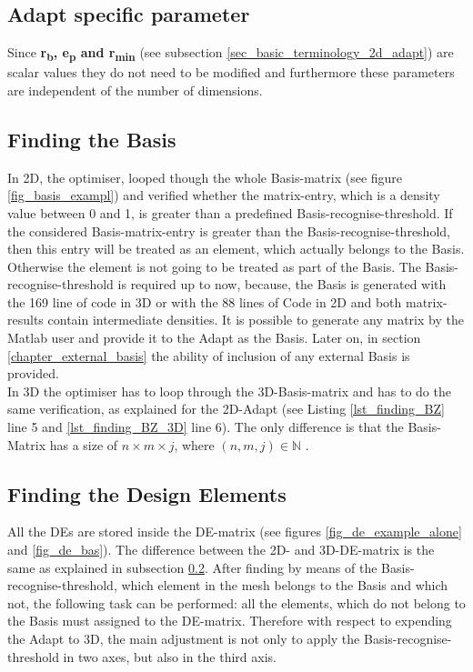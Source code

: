 \subsection{ Adapt specific parameter }
Since \textbf{r\textsubscript{b}, e\textsubscript{p} and  r\textsubscript{min}} (see subsection \ref{sec_basic_terminology_2d_adapt}) are  scalar
values they do not need to be modified and furthermore 
these parameters are independent of the number of dimensions. \\

\subsection{Finding the \textbf{Basis}} 
\label{subsection_finding_basis}

In 2D, the optimiser, looped though the whole Basis-matrix (see figure \ref{fig_basis_exampl}) and verified whether the matrix-entry, which is a density value between 0 and 1, is greater than a predefined Basis-recognise-threshold. If the considered Basis-matrix-entry is greater than
the Basis-recognise-threshold, then this entry
 will be treated as an element, which actually belongs to the Basis.
 Otherwise the element is not going to be treated as part of the Basis.
 The Basis-recognise-threshold is required up to now, because, the Basis is generated with the 169 line of code in 3D or with the 88 lines of Code in 2D and both
  matrix-results contain intermediate densities.
  It is possible to generate any matrix by the Matlab user
   and provide it to the Adapt as the Basis. 
   Later on, in section \ref{chapter_external_basis} 
   the ability of inclusion of any external Basis is provided.\\
   
In 3D the optimiser has to loop through the 3D-Basis-matrix and has to do the same verification, as explained for the 2D-Adapt (see Listing \ref{lst_finding_BZ} line 5 and \ref{lst_finding_BZ_3D} line 6).
 The only difference is that the Basis-Matrix has a size of \textbf{$n \times m \times j$}, where  $(n , m,j) \in \mathbb{N} $ .\\


\subsection{Finding the \textbf{Design Elements}}
\label{subsection_finding_DEs}
All the DEs are stored inside the DE-matrix (see figures  \ref{fig_de_example_alone} 
and \ref{fig_de_bas}). 
The difference between 
the 2D- and 3D-DE-matrix is the same as explained
in subsection \ref{subsection_finding_basis}. 
After finding by means of 
the Basis-recognise-threshold, which element
 in the mesh belongs to the Basis and which not, 
 the following task can be performed: all the elements,
  which do not belong to the Basis must assigned 
  to the DE-matrix. Therefore with respect to 
  expending the Adapt to 3D, the main adjustment 
  is not only to apply the Basis-recognise-threshold 
  in two axes, but also in the third axis.\\

